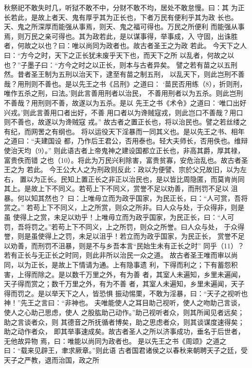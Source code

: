 \documentclass[12pt,UTF8]{ctexbook}
\begin{document}
秋祭祀不敢失时几，听狱不敢不中，分财不敢不均，居处不敢怠慢。曰：其 
为正长若此，是故上者天、鬼有厚乎其为正长也，下者万民有便利乎其为政 
长也。天、鬼之所深厚而能强从事焉，则天、鬼之福可得也。万民之所便利 
而能强从事焉，则万民之亲可得也。其为政若此，是以谋事得，举事成，入 
守固，出诛胜者，何故之以也？曰：唯以尚同为政者也。故古者圣王之为政 
若此。 
今天下之人曰：“方今之时，天下之正长犹未废乎天下也，而天下之所 
以乱者，何故之以也？”子墨子曰：“方今之时之以正长，则本与古者异矣。 
譬之若有苗之以五刑然。昔者圣王制为五刑以治天下，逮至有苗之制五刑， 
以乱天下，则此岂刑不善哉？用刑则不善也。是以先王之书《吕刑》之道曰： 
‘苗民否用练（8），折则刑，唯作五杀之刑，曰法。’则此言善用刑者以治民， 
不善用刑者以为五杀。则此岂刑不善哉？用刑则不善，故遂以为五杀。是以 
先王之书《术令》之道曰：‘唯口出好兴戎。’则此言善用口者出好，不善 
用口者以为谗贼寇戎，则此岂口不善哉？用口则不善也，故遂以为谗贼寇 
戎。” 
故古者之置正长也，将以治民也。譬之若丝缕之有纪，而网罟之有纲也。 
将以运役天下淫暴而一同其义也。是以先王之书、相年之道曰：“夫建国设 
都，乃作后王君公，否用泰也。轻大夫师长，否用佚也。维辩使治天均（9）。” 
则此语古者上帝鬼神之建设国都立正长也，非高其爵，厚其禄，富贵佚而错 
之也（10）。将此为万民兴利除害，富贵贫寡，安危治乱也。故古者圣王之为 
若此。 
今王公大人之为刑政则反此：政以为便譬、宗於父兄故旧，以为左右， 
置以为正长。民知上置正长之非正以治民也，是以皆比周隐匿，而莫肯尚同 
其上。是故上下不同义。若苟上下不同义，赏誉不足以劝善，而刑罚不足以 
沮暴。何以知其然也？ 
曰：上唯毋立而为政乎国家，为民正长，曰：“人可赏，吾将赏之。” 
若苟上下不同义，上之所赏，则众之所非。曰人众与处，于众得非，则是虽 
使得上之赏，未足以劝乎！上唯毋立而为政乎国家，为民正长，曰：“人可 
罚，吾将罚之。”若苟上下不同义，上之所罚，则众之所誉。曰人众与处， 
于众得誉，则是虽使得上之罚，未足以沮乎！若立而为政乎国家，为民正长， 
赏誉不足以劝善，而刑罚不沮暴，则是不与乡吾本言“民始生未有正长之时” 
同乎（11）？若有正长与无正长之时同，则此非所以治民一众之道。 
故古者圣王唯而审以尚同，以为正长，是故上下情请为通。上有隐事遗 
利，下得而利之；下有蓄怨积害，上得而除之。是以数千万里之外，有为善 
者，其室人未遍知，乡里未遍闻，天子得而赏之；数千万里之外，有为不善 
者，其室人未遍知，乡里未遍闻，天子得而罚之。是以举天下之人，皆恐惧 
振动惕栗，不敢为淫暴，曰：“天子之视听也神！”先王之言曰：“非神也。 
夫唯能使人之耳目助己视听，使人之吻助己言谈，使人之心助己思虑，使人 
之股肱助己动作。”助己视听者众，则其所闻见者远矣；助之言谈者众，则 
其德音之所抚循者博矣，助之思虑者众，则其谈谋度速得矣；助之动作者众， 
即其举事速成矣。故古者圣人之所以济事成功，垂名于后世者，无他故异物 
焉，曰：唯能以尚同为政者也。 
是以先王之书《周颂》之道之曰：“载来见辟王，聿求厥章。”则此语 
古者国君诸侯之以春秋来朝聘天子之廷，受天子之严教，退而治国，政之所 
\end{document}
